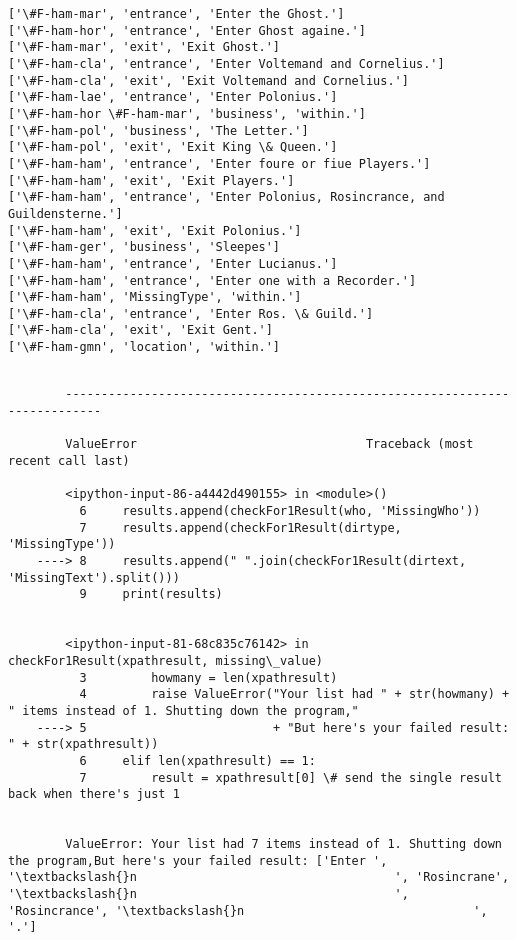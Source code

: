 \documentclass[11pt]{article}
\begin{document}
    \begin{Verbatim}[commandchars=\\\{\}]
['\#F-ham-mar', 'entrance', 'Enter the Ghost.']
['\#F-ham-hor', 'entrance', 'Enter Ghost againe.']
['\#F-ham-mar', 'exit', 'Exit Ghost.']
['\#F-ham-cla', 'entrance', 'Enter Voltemand and Cornelius.']
['\#F-ham-cla', 'exit', 'Exit Voltemand and Cornelius.']
['\#F-ham-lae', 'entrance', 'Enter Polonius.']
['\#F-ham-hor \#F-ham-mar', 'business', 'within.']
['\#F-ham-pol', 'business', 'The Letter.']
['\#F-ham-pol', 'exit', 'Exit King \& Queen.']
['\#F-ham-ham', 'entrance', 'Enter foure or fiue Players.']
['\#F-ham-ham', 'exit', 'Exit Players.']
['\#F-ham-ham', 'entrance', 'Enter Polonius, Rosincrance, and Guildensterne.']
['\#F-ham-ham', 'exit', 'Exit Polonius.']
['\#F-ham-ger', 'business', 'Sleepes']
['\#F-ham-ham', 'entrance', 'Enter Lucianus.']
['\#F-ham-ham', 'entrance', 'Enter one with a Recorder.']
['\#F-ham-ham', 'MissingType', 'within.']
['\#F-ham-cla', 'entrance', 'Enter Ros. \& Guild.']
['\#F-ham-cla', 'exit', 'Exit Gent.']
['\#F-ham-gmn', 'location', 'within.']

    \end{Verbatim}

    \begin{Verbatim}[commandchars=\\\{\}]

        ---------------------------------------------------------------------------

        ValueError                                Traceback (most recent call last)

        <ipython-input-86-a4442d490155> in <module>()
          6     results.append(checkFor1Result(who, 'MissingWho'))
          7     results.append(checkFor1Result(dirtype, 'MissingType'))
    ----> 8     results.append(" ".join(checkFor1Result(dirtext, 'MissingText').split()))
          9     print(results)
    

        <ipython-input-81-68c835c76142> in checkFor1Result(xpathresult, missing\_value)
          3         howmany = len(xpathresult)
          4         raise ValueError("Your list had " + str(howmany) + " items instead of 1. Shutting down the program,"
    ----> 5                          + "But here's your failed result: " + str(xpathresult))
          6     elif len(xpathresult) == 1:
          7         result = xpathresult[0] \# send the single result back when there's just 1
    

        ValueError: Your list had 7 items instead of 1. Shutting down the program,But here's your failed result: ['Enter ', '\textbackslash{}n                                    ', 'Rosincrane', '\textbackslash{}n                                    ', 'Rosincrance', '\textbackslash{}n                                ', '.']

    \end{Verbatim}
\end{document}
